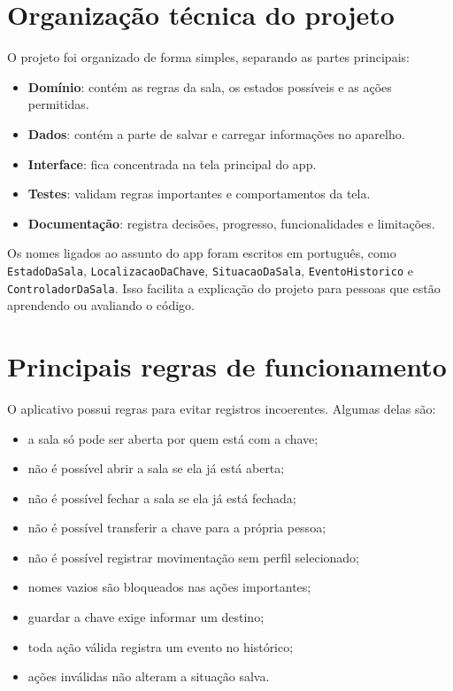 \documentclass[12pt,a4paper]{article}
\begin{document}
\section{Organização técnica do projeto}

O projeto foi organizado de forma simples, separando as partes principais:

\begin{itemize}
    \item \textbf{Domínio}: contém as regras da sala, os estados possíveis e as ações permitidas.
    \item \textbf{Dados}: contém a parte de salvar e carregar informações no aparelho.
    \item \textbf{Interface}: fica concentrada na tela principal do app.
    \item \textbf{Testes}: validam regras importantes e comportamentos da tela.
    \item \textbf{Documentação}: registra decisões, progresso, funcionalidades e limitações.
\end{itemize}

Os nomes ligados ao assunto do app foram escritos em português, como \texttt{EstadoDaSala}, \texttt{LocalizacaoDaChave}, \texttt{SituacaoDaSala}, \texttt{EventoHistorico} e \texttt{ControladorDaSala}. Isso facilita a explicação do projeto para pessoas que estão aprendendo ou avaliando o código.

\section{Principais regras de funcionamento}

O aplicativo possui regras para evitar registros incoerentes. Algumas delas são:

\begin{itemize}
    \item a sala só pode ser aberta por quem está com a chave;
    \item não é possível abrir a sala se ela já está aberta;
    \item não é possível fechar a sala se ela já está fechada;
    \item não é possível transferir a chave para a própria pessoa;
    \item não é possível registrar movimentação sem perfil selecionado;
    \item nomes vazios são bloqueados nas ações importantes;
    \item guardar a chave exige informar um destino;
    \item toda ação válida registra um evento no histórico;
    \item ações inválidas não alteram a situação salva.
\end{itemize}
\end{document}
